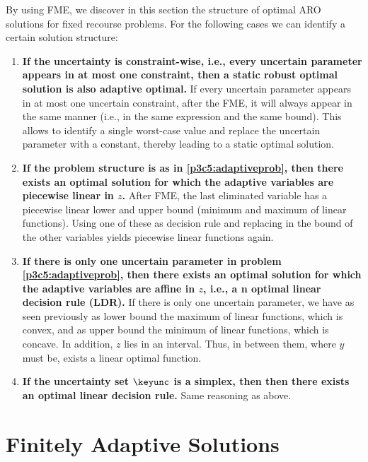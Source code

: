 By using FME, we discover in this section the structure of optimal ARO solutions for fixed recourse problems. For the following cases we can identify a certain solution structure:
\begin{enumerate}
	\item \textbf{If the uncertainty is constraint-wise, i.e., every uncertain parameter appears in at most one constraint, then a static robust optimal solution is also adaptive optimal.} If every uncertain parameter appears in at most one uncertain constraint, after the FME, it will always appear in the same manner (i.e., in the same expression and the same bound). This allows to identify a single worst-case value and replace the uncertain parameter with a constant, thereby leading to a static optimal solution.
	
	\item \textbf{If the problem structure is as in \eqref{p3c5:adaptiveprob}, then there exists an optimal solution for which the adaptive variables are piecewise linear in $z$.} After FME, the last eliminated variable has a piecewise linear lower and upper bound (minimum and maximum of linear functions). Using one of these as decision rule and replacing in the bound of the other variables yields piecewise linear functions again.
	
	\item \textbf{If there is only one uncertain parameter in problem \eqref{p3c5:adaptiveprob}, then there exists an optimal solution for which the adaptive variables are affine in $z$, i.e., a n optimal linear decision rule (LDR). } If there is only one uncertain parameter, we have as seen previously as lower bound the maximum of linear functions, which is convex, and as upper bound the minimum of linear functions, which is concave. In addition, $z$ lies in an interval. Thus, in between them, where $y$ must be, exists a linear optimal function.
	
	\item \textbf{ If the uncertainty set $\keyunc$ is a simplex, then then there exists an optimal linear decision rule.}  Same reasoning as above.
\end{enumerate}

\section{Finitely Adaptive Solutions}

